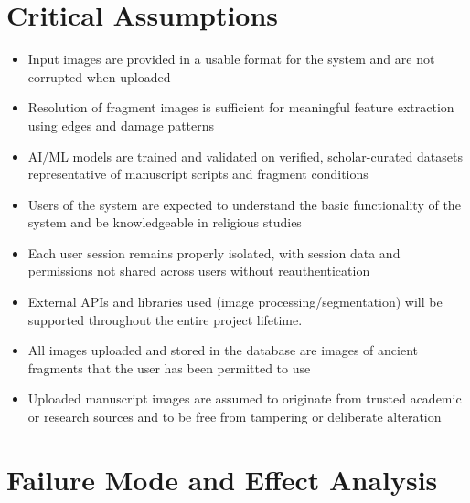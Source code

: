 \documentclass{article}
\begin{document}
\section{Critical Assumptions}

\begin{itemize}
    \item Input images are provided in a usable format for the system and are not corrupted when uploaded
    \item Resolution of fragment images is sufficient for meaningful feature extraction using edges and damage patterns
    \item AI/ML models are trained and validated on verified, scholar-curated datasets representative of manuscript scripts and fragment conditions
    \item Users of the system are expected to understand the basic functionality of the system and be knowledgeable in religious studies
    \item Each user session remains properly isolated, with session data and permissions not shared across users without reauthentication
    \item External APIs and libraries used (image processing/segmentation) will be supported throughout the entire project lifetime.
    \item All images uploaded and stored in the database are images of ancient fragments that the user has been permitted to use
    \item Uploaded manuscript images are assumed to originate from trusted academic or research sources and to be free from tampering or deliberate alteration
\end{itemize}

\section{Failure Mode and Effect Analysis}
\end{document}
